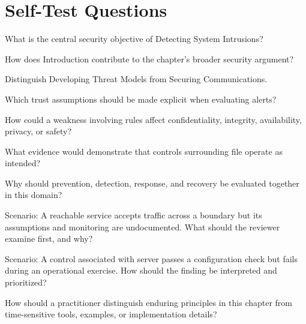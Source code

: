 \documentclass[11pt,letterpaper]{article}
\begin{document}
\section*{Self-Test Questions}
\begin{CornellRecallList}
\item What is the central security objective of Detecting System Intrusions?
\item How does Introduction contribute to the chapter's broader security argument?
\item Distinguish Developing Threat Models from Securing Communications.
\item Which trust assumptions should be made explicit when evaluating alerts?
\item How could a weakness involving rules affect confidentiality, integrity, availability, privacy, or safety?
\item What evidence would demonstrate that controls surrounding file operate as intended?
\item Why should prevention, detection, response, and recovery be evaluated together in this domain?
\item Scenario: A reachable service accepts traffic across a boundary but its assumptions and monitoring are undocumented. What should the reviewer examine first, and why?
\item Scenario: A control associated with server passes a configuration check but fails during an operational exercise. How should the finding be interpreted and prioritized?
\item How should a practitioner distinguish enduring principles in this chapter from time-sensitive tools, examples, or implementation details?
\end{CornellRecallList}
\end{document}
